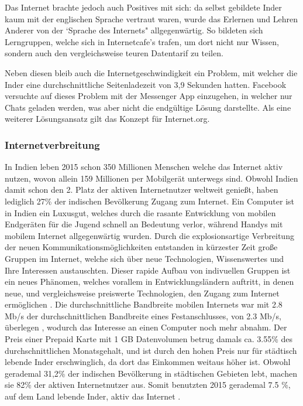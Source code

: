 \documentclass{article}
\begin{document}
\medskip

Das Internet brachte jedoch auch Positives mit sich: da selbst gebildete Inder kaum mit der englischen Sprache vertraut waren, wurde das Erlernen und Lehren Anderer von der `Sprache des Internets" allgegenwärtig.
So bildeten sich Lerngruppen, welche sich in Internetcafe's trafen, um dort nicht nur Wissen, sondern auch den vergleichsweise teuren Datentarif zu teilen.

Neben diesen bleib auch die Internetgeschwindigkeit ein Problem, mit welcher die Inder eine durchschnittliche Seitenladezeit von 3,9 Sekunden hatten\autocite{mashable}.
Facebook versuchte auf dieses Problem mit der Messenger App einzugehen, in welcher nur Chats geladen werden, was aber nicht die endgültige Lösung darstellte.
Als eine weiterer Lösungsansatz gilt das Konzept für Internet.org.

\subsubsection{Internetverbreitung}

In Indien leben 2015 schon 350 Millionen Menschen welche das Internet aktiv nutzen\autocite{slideshareIndia}, wovon allein 159 Millionen per Mobilgerät unterwegs sind.
Obwohl Indien damit schon den 2. Platz der aktiven Internetnutzer weltweit genießt, haben lediglich 27\% der indischen Bevölkerung Zugang zum Internet\autocite{InternetCountry}.
\medskip 
Ein Computer ist in Indien ein Luxusgut, welches durch die rasante Entwicklung von mobilen Endgeräten für die Jugend schnell an Bedeutung verlor, während Handys mit mobilem Internet allgegenwärtig wurden.
Durch die explosionsartige Verbreitung der neuen Kommunikationsmöglichkeiten entstanden in kürzester Zeit große Gruppen im Internet, welche sich über neue Technologien, Wissenswertes und Ihre Interessen austauschten.
Dieser rapide Aufbau von indivuellen Gruppen ist ein neues Phänomen, welches vorallem in Entwicklungsländern auftritt, in denen neue, und vergleichsweise preiswerte Technologien, den Zugang zum Internet ermöglichen \textcite{empowermentThroughFacebook}.
\medskip
Die durchschnittliche Bandbreite mobilen Internets war mit 2.8 Mb/s der durchschnittlichen Bandbreite eines Festanschlusses, von 2.3 Mb/s, überlegen \autocite{slideshareIndia}, wodurch das Interesse an einen Computer noch mehr abnahm.
Der Preis einer Prepaid Karte mit 1 GB Datenvolumen betrug damals ca. 3.55\% des durchschnittlichen Monatsgehalt\autocite{broadbandAgency}, und ist durch den hohen Preis nur für städtisch lebende Inder erschwinglich, da dort das Einkommen weitaus höher ist.
Obwohl gerademal 31,2\% der indischen Bevölkerung in städtischen Gebieten lebt, machen sie 82\% der aktiven Internetnutzer aus\autocite{IndiaBevölkerung}.
Somit benutzten 2015 gerademal 7.5 \%, auf dem Land lebende Inder, aktiv das Internet \autocite{slideshareIndia}.
\end{document}
